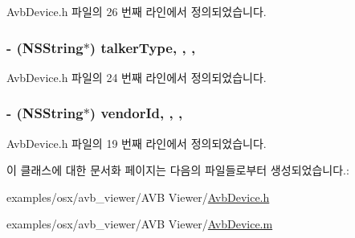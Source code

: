 Avb\+Device.\+h 파일의 26 번째 라인에서 정의되었습니다.

\subsubsection[{\texorpdfstring{talker\+Type}{talkerType}}]{\setlength{\rightskip}{0pt plus 5cm}-\/ (N\+S\+String$\ast$) talker\+Type\hspace{0.3cm}{\ttfamily [read]}, {\ttfamily [write]}, {\ttfamily [atomic]}, {\ttfamily [copy]}}\hypertarget{interface_avb_device_a7057729d8a5a4ea18e2e897bad68691b}{}\label{interface_avb_device_a7057729d8a5a4ea18e2e897bad68691b}


Avb\+Device.\+h 파일의 24 번째 라인에서 정의되었습니다.

\subsubsection[{\texorpdfstring{vendor\+Id}{vendorId}}]{\setlength{\rightskip}{0pt plus 5cm}-\/ (N\+S\+String$\ast$) vendor\+Id\hspace{0.3cm}{\ttfamily [read]}, {\ttfamily [write]}, {\ttfamily [atomic]}, {\ttfamily [copy]}}\hypertarget{interface_avb_device_a529162cb39492e7aefb7c0944a1aaac8}{}\label{interface_avb_device_a529162cb39492e7aefb7c0944a1aaac8}


Avb\+Device.\+h 파일의 19 번째 라인에서 정의되었습니다.



이 클래스에 대한 문서화 페이지는 다음의 파일들로부터 생성되었습니다.\+:\begin{DoxyCompactItemize}
\item 
examples/osx/avb\+\_\+viewer/\+A\+V\+B Viewer/\hyperlink{_avb_device_8h}{Avb\+Device.\+h}\item 
examples/osx/avb\+\_\+viewer/\+A\+V\+B Viewer/\hyperlink{_avb_device_8m}{Avb\+Device.\+m}\end{DoxyCompactItemize}
